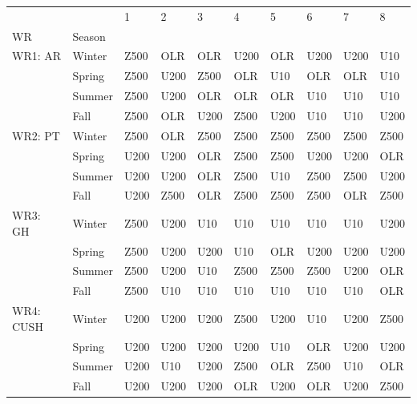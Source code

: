 \begin{tabular}{llllllllll}
\toprule
          &      &     1 &     2 &     3 &     4 &     5 &     6 &     7 &     8 \\
WR & Season &       &       &       &       &       &       &       &       \\
\midrule
WR1: AR & Winter &  Z500 &   OLR &   OLR &  U200 &   OLR &  U200 &  U200 &   U10 \\
          & Spring &  Z500 &  U200 &  Z500 &   OLR &   U10 &   OLR &   OLR &   U10 \\
          & Summer &  Z500 &  U200 &   OLR &   OLR &   OLR &   U10 &   U10 &   U10 \\
          & Fall &  Z500 &   OLR &  U200 &  Z500 &  U200 &   U10 &   U10 &  U200 \\
WR2: PT & Winter &  Z500 &   OLR &  Z500 &  Z500 &  Z500 &  Z500 &  Z500 &  Z500 \\
          & Spring &  U200 &  U200 &   OLR &  Z500 &  Z500 &  U200 &  U200 &   OLR \\
          & Summer &  U200 &  U200 &   OLR &  Z500 &   U10 &  Z500 &  Z500 &  U200 \\
          & Fall &  U200 &  Z500 &   OLR &  Z500 &  Z500 &  Z500 &   OLR &  Z500 \\
WR3: GH & Winter &  Z500 &  U200 &   U10 &   U10 &   U10 &   U10 &   U10 &  U200 \\
          & Spring &  Z500 &  U200 &  U200 &   U10 &   OLR &  U200 &  U200 &  U200 \\
          & Summer &  Z500 &  U200 &   U10 &  Z500 &  Z500 &  Z500 &  U200 &   OLR \\
          & Fall &  Z500 &   U10 &   U10 &   U10 &   U10 &   U10 &   U10 &   OLR \\
WR4: CUSH & Winter &  U200 &  U200 &  U200 &  Z500 &  U200 &   U10 &  U200 &  Z500 \\
          & Spring &  U200 &  U200 &  U200 &  U200 &   U10 &   OLR &  U200 &  U200 \\
          & Summer &  U200 &   U10 &  U200 &  Z500 &   OLR &  Z500 &   U10 &   OLR \\
          & Fall &  U200 &  U200 &  U200 &   OLR &  U200 &   OLR &  U200 &  Z500 \\
\bottomrule
\end{tabular}
